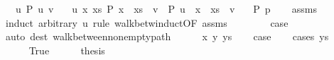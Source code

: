 \begin{isabellebody}
\ \ \ {\isachardoublequoteopen}{\isasymAnd}u{\isachardot}{\kern0pt}\ P\ {\isacharbrackleft}{\kern0pt}u{\isacharcomma}{\kern0pt}\ v{\isacharbrackright}{\kern0pt}{\isachardoublequoteclose}\isanewline
\ \ \ {\isachardoublequoteopen}{\isasymAnd}u\ x\ xs{\isachardot}{\kern0pt}\ P\ {\isacharparenleft}{\kern0pt}x\ {\isacharhash}{\kern0pt}\ xs\ {\isacharat}{\kern0pt}\ {\isacharbrackleft}{\kern0pt}v{\isacharbrackright}{\kern0pt}{\isacharparenright}{\kern0pt}\ {\isasymLongrightarrow}\ P\ {\isacharparenleft}{\kern0pt}u\ {\isacharhash}{\kern0pt}\ x\ {\isacharhash}{\kern0pt}\ xs\ {\isacharat}{\kern0pt}\ {\isacharbrackleft}{\kern0pt}v{\isacharbrackright}{\kern0pt}{\isacharparenright}{\kern0pt}{\isachardoublequoteclose}\isanewline
\ \ \ {\isachardoublequoteopen}P\ p{\isachardoublequoteclose}\isanewline
%
\isadelimproof
\ \ %
\endisadelimproof
%
\isatagproof
{}\isamarkupfalse%
\ assms\isanewline
{}\isamarkupfalse%
\ {\isacharparenleft}{\kern0pt}induct\ arbitrary{\isacharcolon}{\kern0pt}\ u\ rule{\isacharcolon}{\kern0pt}\ walk{\isacharunderscore}{\kern0pt}betw{\isacharunderscore}{\kern0pt}induct{\isacharbrackleft}{\kern0pt}OF\ assms{\isacharparenleft}{\kern0pt}{}{\isacharparenright}{\kern0pt}{\isacharbrackright}{\kern0pt}{\isacharparenright}{\kern0pt}\isanewline
\ \ \isamarkupfalse%
\ {}\isanewline
\ \ \isamarkupfalse%
\ {\isacharquery}{\kern0pt}case\isanewline
\ \ \ \ \isamarkupfalse%
\ {\isacharparenleft}{\kern0pt}auto\ dest{\isacharcolon}{\kern0pt}\ walk{\isacharunderscore}{\kern0pt}between{\isacharunderscore}{\kern0pt}nonempty{\isacharunderscore}{\kern0pt}path{\isacharparenleft}{\kern0pt}{}{\isacharcomma}{\kern0pt}\ {}{\isacharparenright}{\kern0pt}{\isacharparenright}{\kern0pt}\isanewline
{}\isamarkupfalse%
\isanewline
\ \ \isamarkupfalse%
\ {\isacharparenleft}{\kern0pt}{}\ x\ y\ ys{\isacharparenright}{\kern0pt}\isanewline
\ \ \isamarkupfalse%
\ {\isacharquery}{\kern0pt}case\isanewline
\ \ \isamarkupfalse%
\ {\isacharparenleft}{\kern0pt}cases\ {\isachardoublequoteopen}ys\ {\isacharequal}{\kern0pt}\ {\isacharbrackleft}{\kern0pt}{\isacharbrackright}{\kern0pt}{\isachardoublequoteclose}{\isacharparenright}{\kern0pt}\isanewline
\ \ \ \ \isamarkupfalse%
\ True\isanewline
\ \ \ \ \isamarkupfalse%
\ {\isacharquery}{\kern0pt}thesis\isanewline
\ \ \ \ \ \ \isamarkupfalse%

\end{isabellebody}
